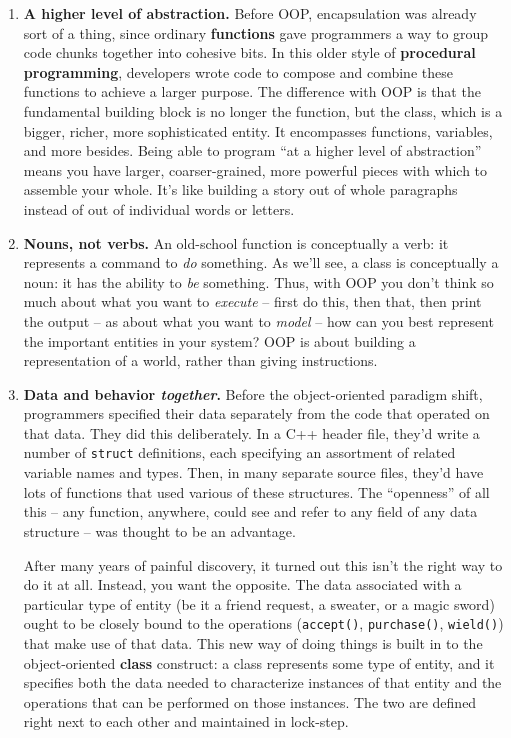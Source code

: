 \begin{enumerate}
\itemsep.1em

\item \textbf{A higher level of abstraction.} Before OOP, encapsulation was
already sort of a thing, since ordinary \textbf{functions} gave programmers a
way to group code chunks together into cohesive bits. In this older style of
\textbf{procedural programming}, developers wrote code to compose and combine
these functions to achieve a larger purpose. The difference with OOP is that
the fundamental building block is no longer the function, but the class, which
is a bigger, richer, more sophisticated entity. It encompasses functions,
variables, and more besides. Being able to program ``at a higher level of
abstraction'' means you have larger, coarser-grained, more powerful pieces
with which to assemble your whole. It's like building a story out of whole
paragraphs instead of out of individual words or letters.

\item \textbf{Nouns, not verbs.} An old-school function is conceptually a
verb: it represents a command to \textit{do} something. As we'll see, a class
is conceptually a noun: it has the ability to \textit{be} something. Thus,
with OOP you don't think so much about what you want to \textit{execute} --
first do this, then that, then print the output -- as about what you want to
\textit{model} -- how can you best represent the important entities in your
system? OOP is about building a representation of a world, rather than giving
instructions.

\item \textbf{Data and behavior \textit{together}.} Before the object-oriented
paradigm shift, programmers specified their data separately from the code that
operated on that data. They did this deliberately. In a C++ header file,
they'd write a number of \texttt{struct} definitions, each specifying an
assortment of related variable names and types. Then, in many separate source
files, they'd have lots of functions that used various of these structures.
The ``openness'' of all this -- any function, anywhere, could see and refer to
any field of any data structure -- was thought to be an advantage.

After many years of painful discovery, it turned out this isn't the right way
to do it at all. Instead, you want the opposite. The data associated with a
particular type of entity (be it a friend request, a sweater, or a magic
sword) ought to be closely bound to the operations (\texttt{accept()},
\texttt{purchase()}, \texttt{wield()}) that make use of that data. This new
way of doing things is built in to the object-oriented \textbf{class}
construct: a class represents some type of entity, and it specifies both the
data needed to characterize instances of that entity and the operations that
can be performed on those instances. The two are defined right next to each
other and maintained in lock-step.


\end{enumerate}
